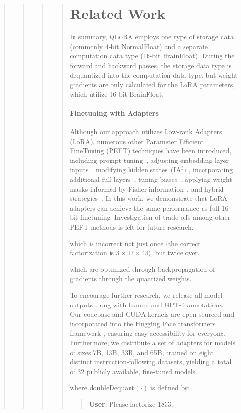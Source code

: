 \begin{quote}
\begin{quote}
\begin{quote}
\begin{quote}
\section{Related Work}

In summary, \textsc{QLoRA} employs one type of storage data (commonly 4-bit NormalFloat) and a separate computation data type (16-bit BrainFloat). During the forward and backward passes, the storage data type is dequantized into the computation data type, but weight gradients are only calculated for the LoRA parameters, which utilize 16-bit BrainFloat.

\paragraph{Finetuning with Adapters} Although our approach utilizes Low-rank Adapters~\citep{hu2021lora} (LoRA), numerous other Parameter Efficient FineTuning (PEFT) techniques have been introduced, including prompt tuning~\citep{qin2021learning,lester2021power,li2021prefix}, adjusting embedding layer inputs~\citep{an2022input}, modifying hidden states~(IA$^3$) \citep{liu2022few}, incorporating additional full layers~\citep{houlsby2019parameter}, tuning biases~\citep{zaken2021bitfit}, applying weight masks informed by Fisher information~\citep{sung2021training}, and hybrid strategies~\citep{henderson2021compacter}. In this work, we demonstrate that LoRA adapters can achieve the same performance as full 16-bit finetuning. Investigation of trade-offs among other PEFT methods is left for future research.

which is incorrect not just once (the correct factorization is $3 \times 17 \times 43$), but twice over.

which are optimized through backpropagation of gradients through the quantized weights. 

To encourage further research, we release all model outputs along with human and GPT-4 annotations. Our codebase and CUDA kernels are open-sourced and incorporated into the Hugging Face transformers framework \citep{wolf2019huggingface}, ensuring easy accessibility for everyone. Furthermore, we distribute a set of adapters for models of sizes 7B, 13B, 33B, and 65B, trained on eight distinct instruction-following datasets, yielding a total of 32 publicly available, fine-tuned models.

where doubleDequant$(\cdot)$ is defined by:

\begin{quote}
    \textbf{User}: Please factorize 1833.


\end{quote}
\end{quote}
\end{quote}
\end{quote}
\end{quote}
